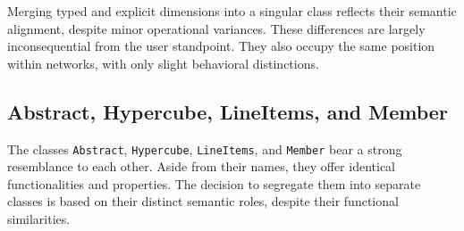 Merging typed and explicit dimensions into a singular class reflects their semantic alignment,
despite minor operational variances.
These differences are largely inconsequential from the user standpoint.
They also occupy the same position within networks, with only slight behavioral distinctions.



\subsection{Abstract, Hypercube, LineItems, and Member}

The classes \texttt{Abstract}, \texttt{Hypercube}, \texttt{LineItems}, and \texttt{Member} bear a strong resemblance to each other.
Aside from their names, they offer identical functionalities and properties.
The decision to segregate them into separate classes is based on their distinct semantic roles,
despite their functional similarities.
